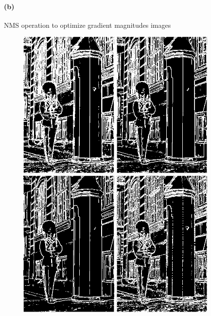 \documentclass{article}
\newcommand{\spart}[1]{\paragraph{(#1)}}
\begin{document}
\spart{b} NMS operation to optimize gradient magnitudes images

\begin{figure}[h!]
  \centering
  	\includegraphics[height=20em]{code/outputs/prob3_b_0.png}
	\includegraphics[height=20em]{code/outputs/prob3_b_1.png}
	\includegraphics[height=20em]{code/outputs/prob3_b_2.png}
	\includegraphics[height=20em]{code/outputs/prob3_b_nms0.png}

\end{figure}
\end{document}
